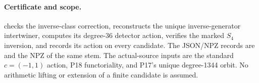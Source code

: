 \paragraph{Certificate and scope.}
checks the inverse-class correction, reconstructs the
unique inverse-generator intertwiner, computes its
degree-36 detector action, verifies the marked $S_4$
inversion, and records its action on every candidate.
The JSON/NPZ records are
and the NPZ of the same stem.  The actual-source inputs
are the standard $c=(-1,1)$ action, P18 functoriality,
and P17's unique degree-1344 orbit.  No arithmetic
lifting or extension of a finite candidate is assumed.
